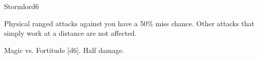 \begin{spellsection}{Stormlord}{6}
    \begin{spellheader}
    \end{spellheader}
    \begin{spellcontent}
        \begin{spelltargetinginfo}
        \end{spelltargetinginfo}
        \begin{spelleffects}
            \spelleffect Physical ranged attacks against you have a 50\% miss chance. Other attacks that simply work at a distance are not affected.
            \spelldur \durshort
        \end{spelleffects}
    \end{spellcontent}
    \begin{spellsubcontent}
        \begin{spelltargetinginfo}
        \end{spelltargetinginfo}
        \begin{spelleffects}
            \begin{spellattack}{Magic vs. Fortitude}
                \spellsuccess {}[d6].
                \spellfailure Half damage.
            \end{spellattack}
        \end{spelleffects}
    \end{spellsubcontent}
    \begin{spellfooter}
        \miscastexplode
    \end{spellfooter}
\end{spellsection}

